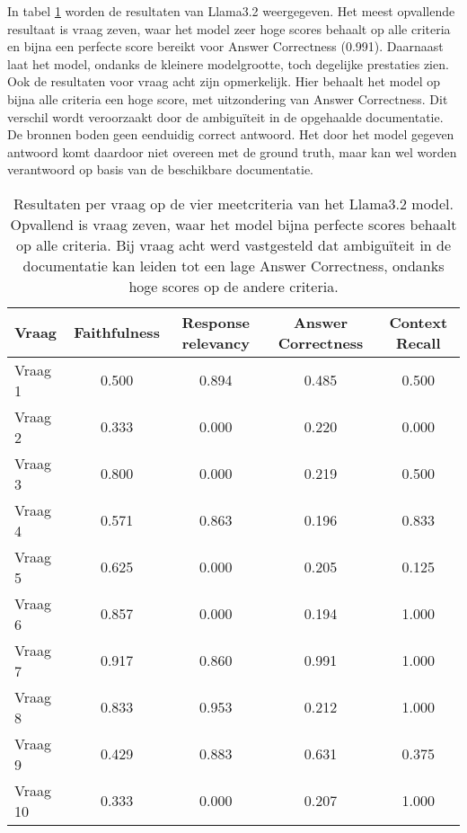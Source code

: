 In tabel \ref{tab:resultaten_vragen_llama3.2} worden de resultaten van Llama3.2 weergegeven. Het meest opvallende resultaat is vraag zeven, waar het model zeer hoge scores behaalt op alle criteria en bijna een perfecte score bereikt voor Answer Correctness (0.991). Daarnaast laat het model, ondanks de kleinere modelgrootte, toch degelijke prestaties zien.
\\[1em]
Ook de resultaten voor vraag acht zijn opmerkelijk. Hier behaalt het model op bijna alle criteria een hoge score, met uitzondering van Answer Correctness. Dit verschil wordt veroorzaakt door de ambiguïteit in de opgehaalde documentatie. De bronnen boden geen eenduidig correct antwoord. Het door het model gegeven antwoord komt daardoor niet overeen met de ground truth, maar kan wel worden verantwoord op basis van de beschikbare documentatie.
\begin{table}[H]
    \centering
    \begin{tabular}{|l|c|c|c|c|}
        \hline
        \textbf{Vraag} & \textbf{Faithfulness} & \textbf{Response relevancy} & \textbf{Answer Correctness} & \textbf{Context Recall} \\
        \hline
        Vraag 1  & 0.500 & 0.894 & 0.485 & 0.500 \\
        Vraag 2  & 0.333 & 0.000 & 0.220 & 0.000 \\
        Vraag 3  & 0.800 & 0.000 & 0.219 & 0.500 \\
        Vraag 4  & 0.571 & 0.863 & 0.196 & 0.833 \\
        Vraag 5  & 0.625 & 0.000 & 0.205 & 0.125 \\
        Vraag 6  & 0.857 & 0.000 & 0.194 & 1.000 \\
        Vraag 7  & 0.917 & 0.860 & 0.991 & 1.000 \\
        Vraag 8  & 0.833 & 0.953 & 0.212 & 1.000 \\
        Vraag 9  & 0.429 & 0.883 & 0.631 & 0.375 \\
        Vraag 10 & 0.333 & 0.000 & 0.207 & 1.000 \\
        \hline
    \end{tabular}
    \caption{Resultaten per vraag op de vier meetcriteria van het Llama3.2 model. Opvallend is vraag zeven, waar het model bijna perfecte scores behaalt op alle criteria. Bij vraag acht werd vastgesteld dat ambiguïteit in de documentatie kan leiden tot een lage Answer Correctness, ondanks hoge scores op de andere criteria.}
    \label{tab:resultaten_vragen_llama3.2}
\end{table}


